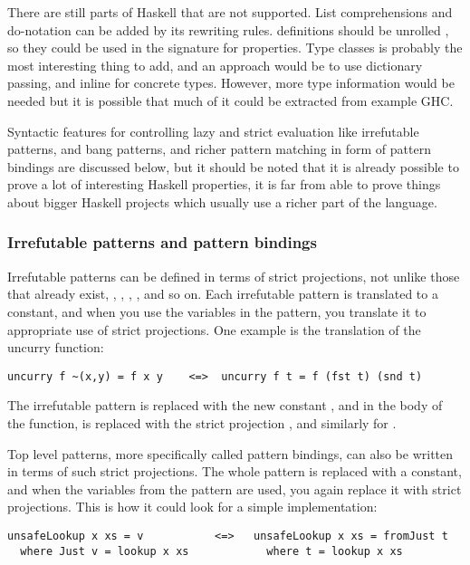 There are still parts of Haskell that are not supported. List
comprehensions and do-notation can be added by its rewriting rules.
 definitions should be unrolled , so they could be used in
the signature for properties. Type classes is probably the most
interesting thing to add, and an approach would be to use dictionary
passing, and inline for concrete types. However, more type information
would be needed but it is possible that much of it could be extracted
from example GHC.

Syntactic features for controlling lazy and strict evaluation like
irrefutable patterns,  and bang patterns, and richer pattern
matching in form of pattern bindings are discussed below, but it
should be noted that it is already possible to prove a lot of
interesting Haskell properties, it is far from able to prove things
about bigger Haskell projects which usually use a richer part of the
language.

\subsubsection{Irrefutable patterns and pattern bindings}

Irrefutable patterns can be defined in terms of strict projections,
not unlike those that already exist, , , ,
, and so on. Each irrefutable pattern is translated to
a constant, and when you use the variables in the pattern, you
translate it to appropriate use of strict projections. One example is
the translation of the uncurry function:

\begin{verbatim}
uncurry f ~(x,y) = f x y    <=>  uncurry f t = f (fst t) (snd t)
\end{verbatim}

The irrefutable pattern  is replaced with the new constant
, and in the body of the function,  is replaced with the
strict projection , and similarly for .

Top level patterns, more specifically called pattern bindings, can
also be written in terms of such strict projections. The whole pattern
is replaced with a constant, and when the variables from the pattern
are used, you again replace it with strict projections. This is how it
could look for a simple  implementation:

\begin{verbatim}
unsafeLookup x xs = v           <=>   unsafeLookup x xs = fromJust t
  where Just v = lookup x xs            where t = lookup x xs
\end{verbatim}

